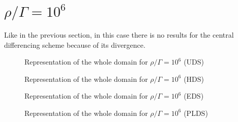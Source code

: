 \section{$\rho/\Gamma=10^{6}$}
Like in the previous section, in this case there is no results for the central differencing scheme because of its divergence.
\begin{figure}[H]
	\centering
	
	\caption{Representation of the whole domain for $\rho/\Gamma=10^{6}$ (UDS)}
\end{figure}
\begin{figure}[H]
	\centering
	
	\caption{Representation of the whole domain for $\rho/\Gamma=10^{6}$ (HDS)}
\end{figure}
\begin{figure}[H]
	\centering
	
	\caption{Representation of the whole domain for $\rho/\Gamma=10^{6}$ (EDS)}
\end{figure}
\begin{figure}[H]
	\centering
	
	\caption{Representation of the whole domain for $\rho/\Gamma=10^{6}$ (PLDS)}
\end{figure}